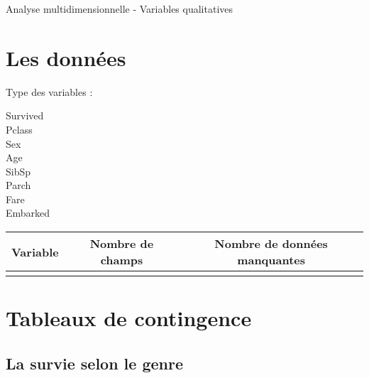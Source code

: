 \documentclass{article}
\begin{document}
\begin{center}
    {\Huge Analyse multidimensionnelle - Variables qualitatives}
\end{center}

\section{Les données}

Type des variables :
\begin{description}
    \item[Survived]
    \item[Pclass]
    \item[Sex]
    \item[Age]
    \item[SibSp]
    \item[Parch]
    \item[Fare]
    \item[Embarked]
\end{description}

\begin{table}[h] 
    \centering
    \begin{tabular}{l|c|c}
        Variable & Nombre de champs & Nombre de données manquantes\\ \hline
        & & \\ %
    \end{tabular}
\end{table}

\begin{figure}[h!] %
    \centering
\end{figure}

\begin{figure}[h!] %
    \centering
\end{figure}

\begin{figure}[h!] %
    \centering
\end{figure}

\newpage
\section{Tableaux de contingence}
\subsection{La survie selon le genre}
\end{document}
